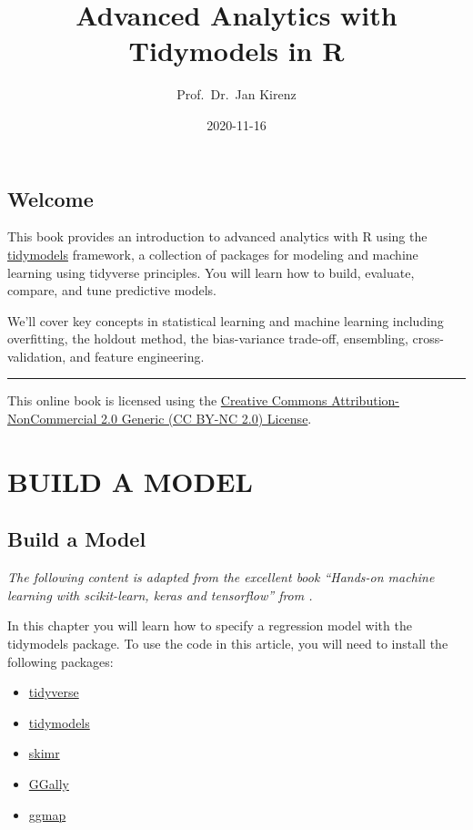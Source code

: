 \documentclass[
]{book}
\title{Advanced Analytics with Tidymodels in R}
\author{Prof.~Dr.~Jan Kirenz}
\date{2020-11-16}
\providecommand{\tightlist}{%
  \setlength{\itemsep}{0pt}\setlength{\parskip}{0pt}}
\begin{document}
\maketitle

{
\setcounter{tocdepth}{1}
\tableofcontents
}
\hypertarget{welcome}{%
\chapter*{Welcome}\label{welcome}}

This book provides an introduction to advanced analytics with R using the \href{https://tidymodels.org}{tidymodels} framework, a collection of packages for modeling and machine learning using tidyverse principles. You will learn how to build, evaluate, compare, and tune predictive models.

We'll cover key concepts in statistical learning and machine learning including overfitting, the holdout method, the bias-variance trade-off, ensembling, cross-validation, and feature engineering.

\hfill\break

\begin{center}\rule{0.5\linewidth}{0.5pt}\end{center}

This online book is licensed using the \href{https://creativecommons.org/licenses/by-nc/2.0/}{Creative Commons Attribution-NonCommercial 2.0 Generic (CC BY-NC 2.0) License}.

\hfill\break

\hypertarget{part-build-a-model}{%
\part{BUILD A MODEL}\label{part-build-a-model}}

\hypertarget{intro}{%
\chapter{Build a Model}\label{intro}}

\emph{The following content is adapted from the excellent book ``Hands-on machine learning with scikit-learn, keras and tensorflow'' from \citet{Geron2019}.}

In this chapter you will learn how to specify a regression model with the tidymodels package. To use the code in this article, you will need to install the following packages:

\begin{itemize}
\tightlist
\item
  \href{https://www.tidyverse.org/}{tidyverse}
\item
  \href{https://www.tidymodels.org/}{tidymodels}
\item
  \href{https://cran.r-project.org/web/packages/skimr/vignettes/skimr.html}{skimr}
\item
  \href{https://ggobi.github.io/ggally/index.html}{GGally}
\item
  \href{}{ggmap}
\end{itemize}
\end{document}
